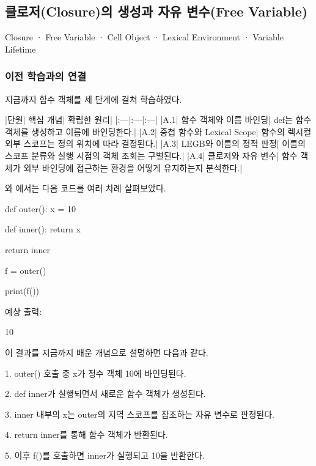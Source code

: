 

\subsection{클로저(Closure)의 생성과 자유 변수(Free Variable)}

Closure · Free Variable · Cell Object · Lexical Environment · Variable Lifetime

\subsubsection{이전 학습과의 연결}

지금까지 함수 객체를 세 단계에 걸쳐 학습하였다.

\begin{dhktable}
|단원|	핵심 개념|	확립한 원리|
|:---|:---|:---|
|A.1|	함수 객체와 이름 바인딩|	def는 함수 객체를 생성하고 이름에 바인딩한다.|
|A.2|	중첩 함수와 Lexical Scope|	함수의 렉시컬 외부 스코프는 정의 위치에 따라 결정된다.|
|A.3|	LEGB와 이름의 정적 판정|	이름의 스코프 분류와 실행 시점의 객체 조회는 구별된다.|
|A.4|	클로저와 자유 변수|	함수 객체가 외부 바인딩에 접근하는 환경을 어떻게 유지하는지 분석한다.|
\end{dhktable}

와 에서는 다음 코드를 여러 차례 살펴보았다.

\begin{dhkcode}
def outer():
    x = 10

    def inner():
        return x

    return inner

f = outer()

print(f())
\end{dhkcode}

예상 출력:

\begin{dhkzsh}
10
\end{dhkzsh}

이 결과를 지금까지 배운 개념으로 설명하면 다음과 같다.

\begin{dhksmry}
1. outer() 호출 중 x가 정수 객체 10에 바인딩된다.

2. def inner가 실행되면서 새로운 함수 객체가 생성된다.

3. inner 내부의 x는 outer의 지역 스코프를 참조하는
   자유 변수로 판정된다.

4. return inner를 통해 함수 객체가 반환된다.

5. 이후 f()를 호출하면 inner가 실행되고 10을 반환한다.
\end{dhksmry}

